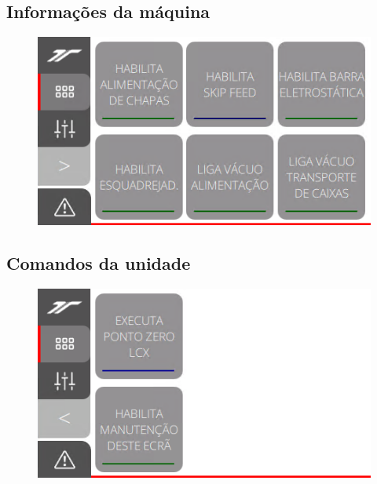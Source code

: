\newpage
\thispagestyle{fancy}
\vspace*{40 pt}
\subsection{\small Informações da máquina}
\vspace*{\fill}
\begin{figure}[h]
    \centering
    \includegraphics{src/imagesICV/11-KTP400-Feeder/2.png}
\end{figure}
\vspace*{\fill}

\newpage
\thispagestyle{fancy}
\vspace*{40 pt}
\subsection{\small Comandos da unidade}
\vspace*{\fill}
\begin{figure}
    \centering
    \includegraphics{src/imagesICV/11-KTP400-Feeder/3.png}
\end{figure}
\vspace*{\fill}

